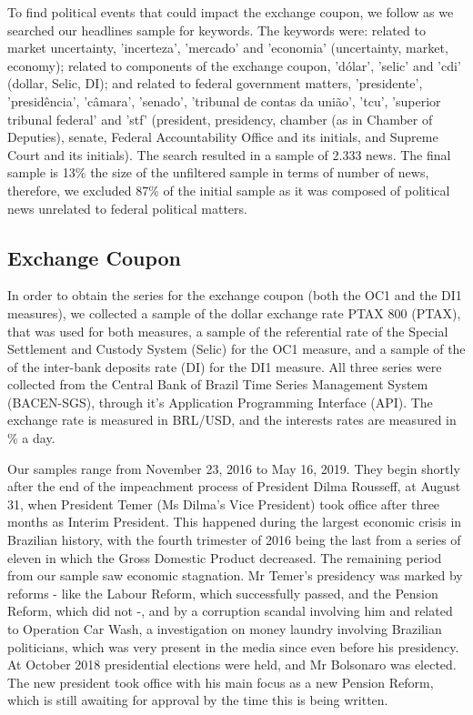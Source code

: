 \documentclass[cic,tc, english]{iiufrgs}
\begin{document}
    To find political events that could impact the exchange coupon, we follow \citet{bbb} as we searched our headlines sample for keywords. The keywords were: related to market uncertainty, 'incerteza', 'mercado' and 'economia' (uncertainty, market, economy); related to components of the exchange coupon, 'dólar', 'selic' and 'cdi' (dollar, Selic, DI); and related to federal government matters, 'presidente', 'presidência', 'câmara', 'senado', 'tribunal de contas da união', 'tcu', 'superior tribunal federal' and 'stf' (president, presidency, chamber (as in Chamber of Deputies), senate, Federal Accountability Office and its initials, and Supreme Court and its initials). The search resulted in a sample of 2.333 news. The final sample is 13\% the size of the unfiltered sample in terms of number of news, therefore, we excluded 87\% of the initial sample as it was composed of political news unrelated to federal political matters.

\subsection{Exchange Coupon} \label{chapter_exchange_coupon}

    In order to obtain the series for the exchange coupon (both the OC1 and the DI1 measures), we collected a sample of the dollar exchange rate PTAX 800 (PTAX), that was used for both measures, a sample of the referential rate of the Special Settlement and Custody System (Selic) for the OC1 measure, and a sample of the of the inter-bank deposits rate (DI) for the DI1 measure. All three series were collected from the Central Bank of Brazil Time Series Management System (BACEN-SGS), through it's Application Programming Interface (API). The exchange rate is measured in BRL/USD, and the interests rates are measured in \% a day.
    
    Our samples range from November 23, 2016 to May 16, 2019. They begin shortly after the end of the impeachment process of President Dilma Rousseff, at August 31, when President Temer (Ms Dilma's Vice President) took office after three months as Interim President. This happened during the largest economic crisis in Brazilian history, with the fourth trimester of 2016 being the last from a series of eleven in which the Gross Domestic Product decreased. The remaining period from our sample saw economic stagnation. Mr Temer's presidency was marked by reforms - like the Labour Reform, which successfully passed, and the Pension Reform, which did not -, and by a corruption scandal involving him and related to Operation Car Wash, a investigation on money laundry involving Brazilian politicians, which was very present in the media since even before his presidency. At October 2018 presidential elections were held, and Mr Bolsonaro was elected. The new president took office with his main focus as a new Pension Reform, which is still awaiting for approval by the time this is being written.
    
\end{document}

